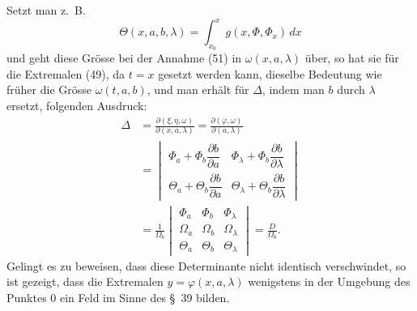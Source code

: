 \documentclass[11pt,a4paper,leqno]{article}
\begin{document}
Setzt man z.~B.
\[
\Theta(x,a,b,\lambda)=\int_{x_0}^{x}g(x,\Phi,\Phi_x)\,dx
\]
und geht diese Grösse bei der Annahme (51) in $\omega(x,a,\lambda)$ über, so hat sie für die Extremalen (49), da $t=x$ gesetzt werden kann, dieselbe Bedeutung wie früher die Grösse $\omega(t,a,b)$, und man erhält für $\Delta$, indem man $b$ durch $\lambda$ ersetzt, folgenden Ausdruck:
\[
\begin{aligned}
\Delta&=\frac{\partial(\xi,\eta,\omega)}{\partial(x,a,\lambda)}
=\frac{\partial(\varphi,\omega)}{\partial(a,\lambda)} \\
&=\begin{vmatrix}
\Phi_a+\Phi_b\dfrac{\partial b}{\partial a}&\Phi_\lambda+\Phi_b\dfrac{\partial b}{\partial\lambda}\\[1.0ex]
\Theta_a+\Theta_b\dfrac{\partial b}{\partial a}&\Theta_\lambda+\Theta_b\dfrac{\partial b}{\partial\lambda}
\end{vmatrix}\\
&=\frac{1}{\Omega_b}\begin{vmatrix}
\Phi_a&\Phi_b&\Phi_\lambda\\
\Omega_a&\Omega_b&\Omega_\lambda\\
\Theta_a&\Theta_b&\Theta_\lambda
\end{vmatrix}=\frac{D}{\Omega_b}.
\end{aligned}
\]
Gelingt es zu beweisen, dass diese Determinante nicht identisch verschwindet, so ist gezeigt, dass die Extremalen $y=\varphi(x,a,\lambda)$ wenigstens in der Umgebung des Punktes 0 ein Feld im Sinne des \S~39 bilden.
\end{document}

